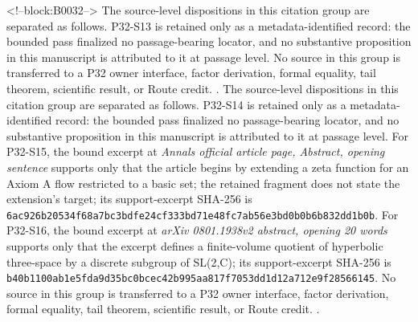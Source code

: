 \documentclass[11pt]{article}
\begin{document}
<!--block:B0032-->
The source-level dispositions in this citation group are separated as follows.
P32-S13 is retained only as a metadata-identified record: the bounded pass finalized no passage-bearing locator, and no substantive proposition in this manuscript is attributed to it at passage level.
No source in this group is transferred to a P32 owner interface, factor derivation, formal equality, tail theorem, scientific result, or Route credit.
\citep{P32-S13}.
The source-level dispositions in this citation group are separated as follows.
P32-S14 is retained only as a metadata-identified record: the bounded pass finalized no passage-bearing locator, and no substantive proposition in this manuscript is attributed to it at passage level.
For P32-S15, the bound excerpt at \emph{Annals official article page, Abstract, opening sentence} supports only that the article begins by extending a zeta function for an Axiom A flow restricted to a basic set; the retained fragment does not state the extension's target; its support-excerpt SHA-256 is \texttt{6ac926b2\allowbreak{}0534f68a\allowbreak{}7bc3bdfe\allowbreak{}24cf333b\allowbreak{}d71e48fc\allowbreak{}7ab56e3b\allowbreak{}d0b0b6b8\allowbreak{}32dd1b0b}.
For P32-S16, the bound excerpt at \emph{arXiv 0801.1938v2 abstract, opening 20 words} supports only that the excerpt defines a finite-volume quotient of hyperbolic three-space by a discrete subgroup of SL(2,C); its support-excerpt SHA-256 is \texttt{b40b1100\allowbreak{}ab1e5fda\allowbreak{}9d35bc0b\allowbreak{}cec42b99\allowbreak{}5aa817f7\allowbreak{}053dd1d1\allowbreak{}2a712e9f\allowbreak{}28566145}.
No source in this group is transferred to a P32 owner interface, factor derivation, formal equality, tail theorem, scientific result, or Route credit.
\citep{P32-S14,P32-S15,P32-S16}.
\end{document}
